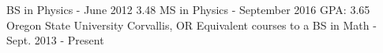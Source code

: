 
\vspace{-3mm}



\begin{cventries}
\vspace{-2mm}


\cventryy
{BS in Physics - June 2012 \hspace{6.735cm}3.48} %
{MS in Physics - September 2016 \hspace{3.95cm}GPA:   3.65} %
{Oregon State University} %
{Corvallis, OR} %
{Equivalent courses to a BS in Math \hspace{5.75cm}-} %
{Sept. 2013 - Present} %
{ %
\begin{cvitems}
\end{cvitems}
}


\end{cventries}
